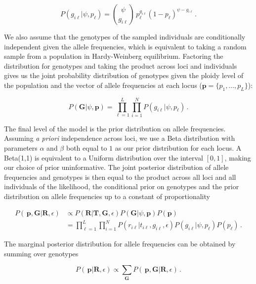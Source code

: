 \documentclass[11pt,english,letterpaper,oneside]{article}
\begin{document}
\begin{equation*}
P(g_{i \ell}|\psi,p_{\ell}) = \binom{\psi}{g_{i \ell}}\,p_{\ell}^{g_{i \ell}}(1-p_{\ell})^{\psi-g_{i \ell}}\,.
\end{equation*}

\noindent We also assume that the genotypes of the sampled individuals are conditionally independent given the allele frequencies, which is equivalent to taking a random sample from a population in Hardy-Weinberg equilibrium. Factoring the distribution for genotypes and taking the product across loci and individuals gives us the joint probability distribution of genotypes given the ploidy level of the population and the vector of allele frequencies at each locus ($\bm{p}=\{p_1,\ldots,p_L\}$):

\begin{equation}\label{condl_prior}
P(\bm{G}|\psi, \bm{p}) = \displaystyle\prod_{\ell=1}^L\displaystyle\prod_{i=1}^N P(g_{i \ell}|\psi, p_{\ell})\,.
\end{equation}

\noindent 

The final level of the model is the prior distribution on allele frequencies. Assuming \textit{a priori} independence across loci, we use a Beta distribution with parameters $\alpha$ and $\beta$ both equal to $1$ as our prior distribution for each locus. A Beta(1,1) is equivalent to a Uniform distribution over the interval $[0,1]$, making our choice of prior uninformative. The joint posterior distribution of allele frequencies and genotypes is then equal to the product across all loci and all individuals of the likelihood, the conditional prior on genotypes and the prior distribution on allele frequencies up to a constant of proportionality

\begin{align}\label{posterior}
P(\,\bm{p},\bm{G}|\bm{R},\epsilon) &\propto P(\bm{R}|\bm{T},\bm{G}, \epsilon)P(\bm{G}|\psi,\bm{p})P(\bm{p}) \nonumber \\[0.05in]
&= \displaystyle\prod_{\ell=1}^L\displaystyle\prod_{i=1}^N P(r_{i \ell}|t_{i\ell}, g_{i \ell},\epsilon)P(g_{i \ell}|\psi, p_{\ell})P(p_{\ell})\,.
\end{align}

\noindent The marginal posterior distribution for allele frequencies can be obtained by summing over genotypes

\begin{equation}\label{marg_post_p}
P(\,\bm{p}|\bm{R},\epsilon) \propto \displaystyle\sum_{\bm{G}} P(\,\bm{p},\bm{G}|\bm{R},\epsilon)\,.
\end{equation}
\end{document}
